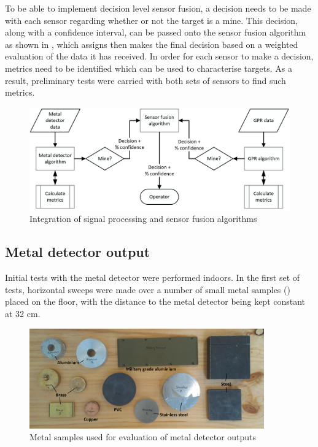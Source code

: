 \documentclass[main.tex]{subfiles}
\begin{document}
To be able to implement decision level sensor fusion, a decision needs to be made with each sensor regarding whether or not the target is a mine. This decision, along with a confidence interval, can be passed onto the sensor fusion algorithm as shown in , which assigns then makes the final decision based on a weighted evaluation of the data it has received. In order for each sensor to make a decision, metrics need to be identified which can be used to characterise targets. As a result, preliminary tests were carried with both sets of sensors to find such metrics.

\begin{figure}[ht]
\includegraphics[width=\textwidth]{3-ConceptDesign/fusion.PNG}
\centering
\caption{Integration of signal processing and sensor fusion algorithms} 
\end{figure}

\subsection{Metal detector output}
Initial tests with the metal detector were performed indoors. In the first set of tests, horizontal sweeps were made over a number of small metal samples () placed on the floor, with the distance to the metal detector being kept constant at 32 cm. 

\begin{figure}[ht]
\includegraphics[width=0.9\textwidth]{3-ConceptDesign/samples.jpg}
\centering
\caption{Metal samples used for evaluation of metal detector outputs} 
\end{figure}
\end{document}
